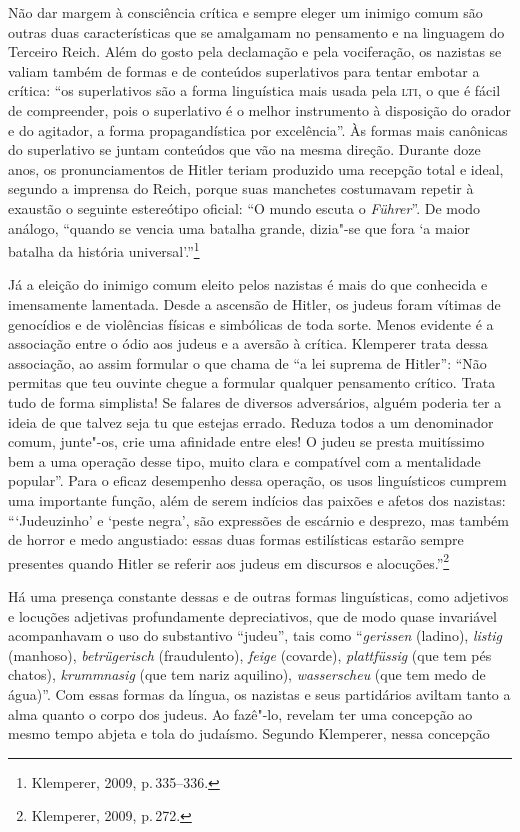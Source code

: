 Não dar margem à consciência crítica e sempre eleger um inimigo comum
são outras duas características que se amalgamam no pensamento e na
linguagem do Terceiro Reich. Além do gosto pela declamação e pela
vociferação, os nazistas se valiam também de formas e de conteúdos
superlativos para tentar embotar a crítica: ``os superlativos são a
forma linguística mais usada pela \textsc{lti}, o que é fácil de compreender,
pois o superlativo é o melhor instrumento à disposição do orador e do
agitador, a forma propagandística por excelência''. Às formas mais
canônicas do superlativo se juntam conteúdos que vão na mesma direção.
Durante doze anos, os pronunciamentos de Hitler teriam produzido uma
recepção total e ideal, segundo a imprensa do Reich, porque suas
manchetes costumavam repetir à exaustão o seguinte estereótipo oficial:
``O mundo escuta o \emph{Führer}''. De modo análogo, ``quando se vencia
uma batalha grande, dizia"-se que fora `a maior batalha da história
universal'.''\footnote{Klemperer, 2009, p.\,335--336.}

Já a eleição do inimigo comum eleito pelos nazistas é mais do que
conhecida e imensamente lamentada. Desde a ascensão de Hitler, os judeus
foram vítimas de genocídios e de violências físicas e simbólicas de toda
sorte. Menos evidente é a associação entre o ódio aos judeus e a aversão
à crítica. Klemperer trata dessa associação, ao assim formular o que
chama de ``a lei suprema de Hitler'': ``Não permitas que teu ouvinte
chegue a formular qualquer pensamento crítico. Trata tudo de forma
simplista! Se falares de diversos adversários, alguém poderia ter a
ideia de que talvez seja tu que estejas errado. Reduza todos a um
denominador comum, junte"-os, crie uma afinidade entre eles! O judeu se
presta muitíssimo bem a uma operação desse tipo, muito clara e
compatível com a mentalidade popular''. Para o eficaz desempenho dessa
operação, os usos linguísticos cumprem uma importante função, além de
serem indícios das paixões e afetos dos nazistas: ```Judeuzinho' e
`peste negra', são expressões de escárnio e desprezo, mas também de
horror e medo angustiado: essas duas formas estilísticas estarão sempre
presentes quando Hitler se referir aos judeus em discursos e
alocuções.''\footnote{Klemperer, 2009, p.\,272.}

Há uma presença constante dessas e de outras formas linguísticas, como
adjetivos e locuções adjetivas profundamente depreciativos, que de modo
quase invariável acompanhavam o uso do substantivo ``judeu'', tais como
``\emph{gerissen} (ladino), \emph{listig} (manhoso), \emph{betrügerisch}
(fraudulento), \emph{feige} (covarde), \emph{plattfüssig} (que tem pés
chatos), \emph{krummnasig} (que tem nariz aquilino), \emph{wasserscheu}
(que tem medo de água)''. Com essas formas da língua, os nazistas e seus
partidários aviltam tanto a alma quanto o corpo dos judeus. Ao fazê"-lo,
revelam ter uma concepção ao mesmo tempo abjeta e tola do judaísmo.
Segundo Klemperer, nessa concepção

